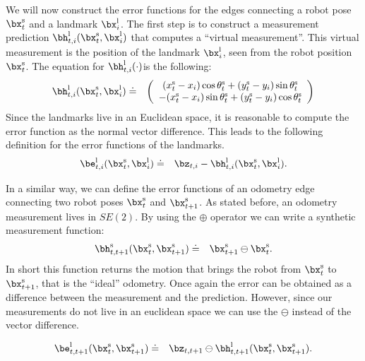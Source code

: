 \documentclass[a4paper]{article}
\begin{document}
We will now construct the error functions for the edges connecting a
robot pose $\bx^\mathrm{s}_t$ and a landmark $\bx^\mathrm{l}_i$.  The
first step is to construct a measurement prediction
$\bh^\mathrm{l}_{t,i}(\bx^\mathrm{s}_t, \bx^\mathrm{l}_i)$ that computes
a ``virtual measurement''. This virtual measurement is the position of
the landmark $\bx^\mathrm{l}_i$, seen from the robot position
$\bx^\mathrm{s}_t$. The equation for $\bh^\mathrm{l}_{t,i}(\cdot)$is the
following:
\begin{eqnarray}
    \bh^\mathrm{l}_{t,i}(\bx^\mathrm{s}_t, \bx^\mathrm{l}_i)   & \doteq & 
    \left( 
    \begin{array}{c}
        (x^\mathrm{s}_t - x_i)  \cos \theta^\mathrm{s}_t + (y^\mathrm{s}_t - y_i) \sin \theta^\mathrm{s}_t \\
      - (x^\mathrm{s}_t - x_i)  \sin \theta^\mathrm{s}_t + (y^\mathrm{s}_t - y_i) \cos \theta^\mathrm{s}_t 
    \end{array}
    \right)
\end{eqnarray}
Since the landmarks live in an Euclidean space, it is reasonable to
compute the error function as the normal vector difference.  This
leads to the following definition for the error functions of the
landmarks.
\begin{eqnarray}
    \be^\mathrm{l}_{t,i}(\bx^\mathrm{s}_t, \bx^\mathrm{l}_i)   & \doteq & \bz_{t,i} - \bh^\mathrm{l}_{t,i}(\bx^\mathrm{s}_t, \bx^\mathrm{l}_i).
    \label{eq:landmarkError}
\end{eqnarray}

In a similar way, we can define the error functions of an odometry
edge connecting two robot poses $\bx^\mathrm{s}_t$ and
$\bx^\mathrm{s}_{t+1}$. As stated before, an odometry measurement lives in $SE(2)$.
By using the $\oplus$ operator we can write a synthetic measurement function:
\begin{eqnarray}
    \bh^\mathrm{s}_{t,t+1}(\bx^\mathrm{s}_t, \bx^\mathrm{s}_{t+1})   & \doteq & \bx^\mathrm{s}_{t+1} \ominus \bx^\mathrm{s}_{t}.
\end{eqnarray}
In short this function returns the motion that brings the robot from
$\bx^\mathrm{s}_t$ to $\bx^\mathrm{s}_{t+1}$, that is the ``ideal''
odometry.  Once again the error can be obtained as a difference
between the measurement and the prediction. However, since our measurements
do not live in an euclidean space we can use the $\ominus$ instead of the vector difference.

\begin{eqnarray}
    \be^\mathrm{l}_{t,t+1}(\bx^\mathrm{s}_t, \bx^\mathrm{s}_{t+1})   & \doteq & \bz_{t,t+1} \ominus \bh^\mathrm{l}_{t,t+1}(\bx^\mathrm{s}_t, \bx^\mathrm{s}_{t+1}).
    \label{eq:odometryError}
\end{eqnarray}
\end{document}
